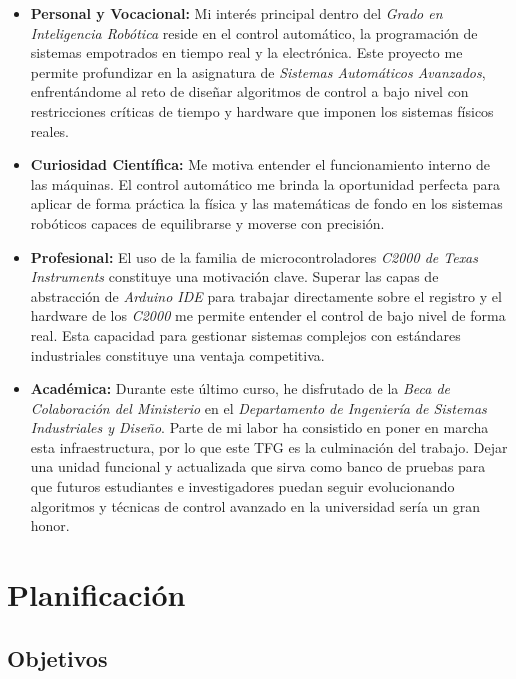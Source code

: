 \documentclass[11pt,fleqn]{book} %
\begin{document}
\begin{itemize}
	\item \textbf{Personal y Vocacional:} Mi interés principal dentro del \textit{Grado en Inteligencia Robótica} reside en el control automático, la programación de sistemas empotrados en tiempo real y la electrónica. Este proyecto me permite profundizar en la asignatura de \textit{Sistemas Automáticos Avanzados}, enfrentándome al reto de diseñar algoritmos de control a bajo nivel con restricciones críticas de tiempo y hardware que imponen los sistemas físicos reales.
	
	\item \textbf{Curiosidad Científica:} Me motiva entender el funcionamiento interno de las máquinas. El control automático me brinda la oportunidad perfecta para aplicar de forma práctica la física y las matemáticas de fondo en los sistemas robóticos capaces de equilibrarse y moverse con precisión. 
	
	\item \textbf{Profesional:} El uso de la familia de microcontroladores \textit{C2000 de Texas Instruments} constituye una motivación clave. Superar las capas de abstracción de \textit{Arduino IDE} para trabajar directamente sobre el registro y el hardware de los \textit{C2000} me permite entender el control de bajo nivel de forma real. Esta capacidad para gestionar sistemas complejos con estándares industriales constituye una ventaja competitiva.
	
	\item \textbf{Académica:} Durante este último curso, he disfrutado de la \textit{Beca de Colaboración del Ministerio} en el \textit{Departamento de Ingeniería de Sistemas Industriales y Diseño}. Parte de mi labor ha consistido en poner en marcha esta infraestructura, por lo que este TFG es la culminación del trabajo. Dejar una unidad funcional y actualizada que sirva como banco de pruebas para que futuros estudiantes e investigadores puedan seguir evolucionando algoritmos y técnicas de control avanzado en la universidad sería un gran honor.
\end{itemize}

\section{Planificación}
\label{cap:planificacion}

\subsection{Objetivos}
\label{cap:objetivos}
\end{document}
